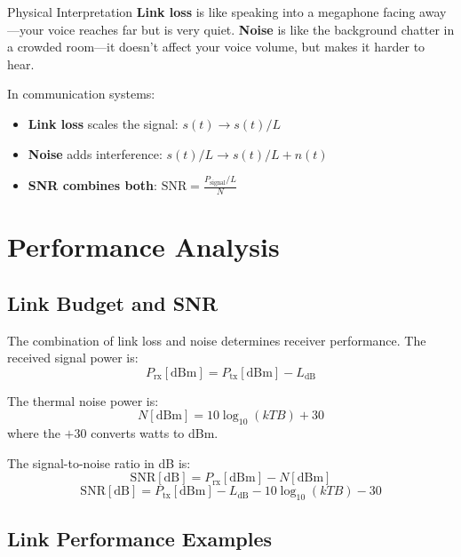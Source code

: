 \begin{calloutbox}{Physical Interpretation}
\textbf{Link loss} is like speaking into a megaphone facing away---your voice reaches far but is very quiet. \textbf{Noise} is like the background chatter in a crowded room---it doesn't affect your voice volume, but makes it harder to hear.

In communication systems:
\begin{itemize}
\item \textbf{Link loss} scales the signal: $s(t) \rightarrow s(t)/L$
\item \textbf{Noise} adds interference: $s(t)/L \rightarrow s(t)/L + n(t)$
\item \textbf{SNR combines both}: $\text{SNR} = \frac{P_{\text{signal}}/L}{N}$
\end{itemize}
\end{calloutbox}

\section{Performance Analysis}

\subsection{Link Budget and SNR}\label{link-budget-and-snr}

The combination of link loss and noise determines receiver performance. The received signal power is:
\begin{equation}
P_{\text{rx}} [\text{dBm}] = P_{\text{tx}} [\text{dBm}] - L_{\text{dB}}
\end{equation}

The thermal noise power is:
\begin{equation}
N [\text{dBm}] = 10\log_{10}(kTB) + 30
\end{equation}
where the $+30$ converts watts to dBm.

The signal-to-noise ratio in dB is:
\begin{equation}
\text{SNR} [\text{dB}] = P_{\text{rx}} [\text{dBm}] - N [\text{dBm}]
\end{equation}
\begin{equation}
\text{SNR} [\text{dB}] = P_{\text{tx}} [\text{dBm}] - L_{\text{dB}} - 10\log_{10}(kTB) - 30
\end{equation}

\subsection{Link Performance Examples}

